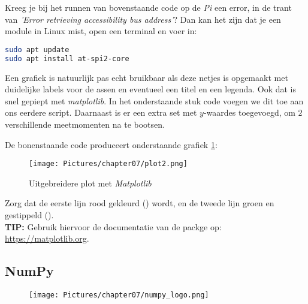 \newpage

\begin{remark}
Kreeg je bij het runnen van bovenstaande code op de \textit{Pi} een error, in de trant van \textit{'Error retrieving accessibility bus address'}? Dan kan het zijn dat je een module in Linux mist, open een terminal en voer in: 
\begin{lstlisting}[language=bash]
sudo apt update
sudo apt install at-spi2-core
\end{lstlisting}
\end{remark}

Een grafiek is natuurlijk pas echt bruikbaar als deze netjes is opgemaakt met duidelijke labels voor de assen en eventueel een titel en een legenda. Ook dat is snel gepiept met \textit{matplotlib}. In het onderstaande stuk code voegen we dit toe aan ons eerdere script. Daarnaast is er een extra set met $y$-waardes toegevoegd, om $2$ verschillende meetmomenten na te bootsen.


De bonenstaande code produceert onderstaande grafiek \ref{fig:plot2}:
\begin{figure}[h!]
\centering\texttt{[image: Pictures/chapter07/plot2.png]}
\caption{Uitgebreidere plot met \textit{Matplotlib}}
\label{fig:plot2} 
\end{figure}

\begin{exercise}
Zorg dat de eerste lijn rood gekleurd () wordt, en de tweede lijn groen en gestippeld (). \\
\textbf{TIP: } Gebruik hiervoor de documentatie van de packge op: \url{https://matplotlib.org}. 
\end{exercise}

\newpage

\subsection{NumPy}

\begin{figure}[h!]
\centering\texttt{[image: Pictures/chapter07/numpy\_logo.png]}
\label{fig:numpylogo} %
\end{figure}

